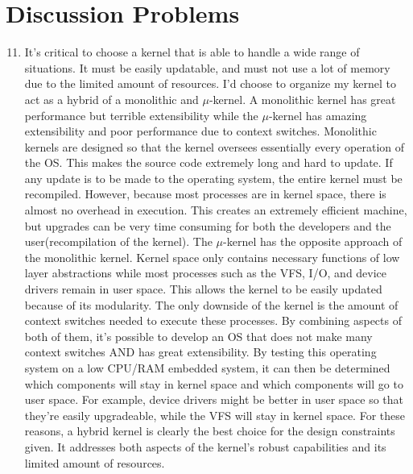 \documentclass[12pt]{article}
\begin{document}
\section{Discussion Problems}

\begin{enumerate}
	\setcounter{enumi}{10}
	
	\item It's critical to choose a kernel that is able to handle a wide range of situations. It must be easily updatable, and must not use a lot of memory due to the limited amount of resources. I'd choose to organize my kernel to act as a hybrid of a monolithic and $\mu$-kernel. A monolithic kernel has great performance but terrible extensibility while the $\mu$-kernel has amazing extensibility and poor performance due to context switches. Monolithic kernels are designed so that the kernel oversees essentially every operation of the OS. This makes the source code extremely long and hard to update. If any update is to be made to the operating system, the entire kernel must be recompiled. However, because most processes are in kernel space, there is almost no overhead in execution. This creates an extremely efficient machine, but upgrades can be very time consuming for both the developers and the user(recompilation of the kernel). The $\mu$-kernel has the opposite approach of the monolithic kernel. Kernel space only contains necessary functions of low layer abstractions while most processes such as the VFS, I/O, and device drivers remain in user space. This allows the kernel to be easily updated because of its modularity. The only downside of the kernel is the amount of context switches needed to execute these processes. By combining aspects of both of them, it's possible to develop an OS that does not make many context switches AND has great extensibility. By testing this operating system on a low CPU/RAM embedded system, it can then be determined which components will stay in kernel space and which components will go to user space. For example, device drivers might be better in user space so that they're easily upgradeable, while the VFS will stay in kernel space. For these reasons, a hybrid kernel is clearly the best choice for the design constraints given. It addresses both aspects of the kernel's robust capabilities and its limited amount of resources.
	

\end{enumerate}
\end{document}
